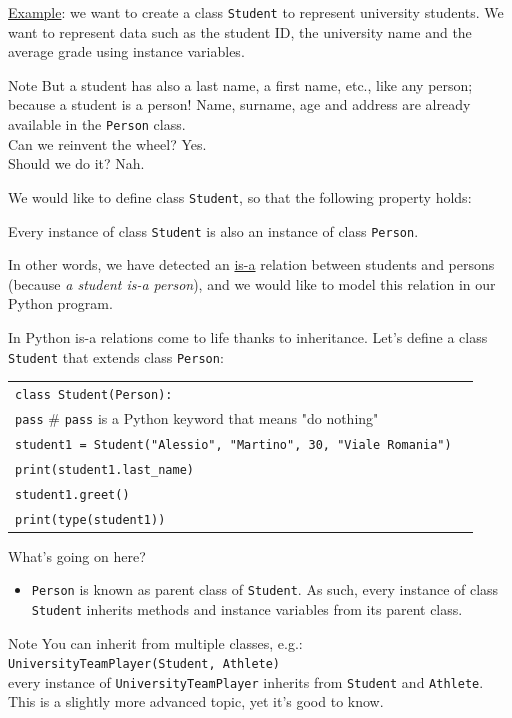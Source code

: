 \documentclass[t,handout,9pt]{beamer}
\begin{document}
\begin{frame}
\vfill
\underline{Example}: we want to create a class \texttt{Student} to represent university students. We want to represent data such as the student ID, the university name and the average grade using instance variables.
\begin{block}{Note}
But a student has also a last name, a first name, etc., like any person; because a student is a person! Name, surname, age and address are already available in the \texttt{Person} class.\\
\vspace{2mm}
Can we reinvent the wheel? Yes.\\
Should we do it? Nah.
\end{block}
We would like to define class \texttt{Student}, so that the following property holds:\\
\begin{center}Every instance of class \texttt{Student} is also an instance of class \texttt{Person}.\end{center}
In other words, we have detected an \underline{is-a} relation between students and persons (because \textit{a student is-a person}), and we would like to model this relation in our Python program.
\vfill
\end{frame}
%
\begin{frame}
\vfill
In Python is-a relations come to life thanks to inheritance. Let's define a class \texttt{Student} that extends class \texttt{Person}:
\begin{table}[]
\begin{flushleft}
\begin{tabular}{ll}
\texttt{class Student(Person):} &  \\
\texttt{\qquad pass} \qquad \qquad \# \texttt{pass} is a Python keyword that means "do nothing" & \\
\texttt{student1 = Student("Alessio", "Martino", 30, "Viale Romania")} &  \\
\texttt{print(student1.last\_name)} &  \\
\texttt{student1.greet()} &  \\
\texttt{print(type(student1))} &  \\
\end{tabular}
\end{flushleft}
\end{table}
\vfill
What's going on here?
\begin{itemize}
	\item \texttt{Person} is known as parent class of \texttt{Student}. As such, every instance of class \texttt{Student} inherits methods and instance variables from its parent class.
\end{itemize}
\begin{block}{Note}
You can inherit from multiple classes, e.g.:\\
\qquad \texttt{UniversityTeamPlayer(Student, Athlete)}\\
every instance of \texttt{UniversityTeamPlayer} inherits from \texttt{Student} and \texttt{Athlete}.\\
This is a slightly more advanced topic, yet it's good to know.
\end{block}
\vfill
\end{frame}
\end{document}
